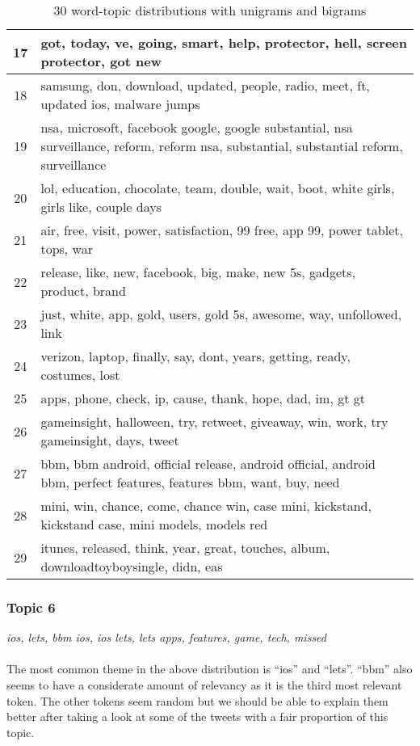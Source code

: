 \begin{table}
\begin{tabular}{c p{16cm}}
    17    & got, today, ve, going, smart, help, protector, hell, screen protector, got new \\ \midrule
    18    & samsung, don, download, updated, people, radio, meet, ft, updated ios, malware jumps \\ \midrule
    19    & nsa, microsoft, facebook google, google substantial, nsa surveillance, reform, reform nsa, substantial, substantial reform, surveillance \\ \midrule
    20    & lol, education, chocolate, team, double, wait, boot, white girls, girls like, couple days \\ \midrule
    21    & air, free, visit, power, satisfaction, 99 free, app 99, power tablet, tops, war \\ \midrule
    22    & release, like, new, facebook, big, make, new 5s, gadgets, product, brand \\ \midrule
    23    & just, white, app, gold, users, gold 5s, awesome, way, unfollowed, link \\ \midrule
    24    & verizon, laptop, finally, say, dont, years, getting, ready, costumes, lost \\ \midrule
    25    & apps, phone, check, ip, cause, thank, hope, dad, im, gt gt \\ \midrule
    26    & gameinsight, halloween, try, retweet, giveaway, win, work, try gameinsight, days, tweet \\ \midrule
    27    & bbm, bbm android, official release, android official, android bbm, perfect features, features bbm, want, buy, need \\ \midrule
    28    & mini, win, chance, come, chance win, case mini, kickstand, kickstand case, mini models, models red \\ \midrule
    29    & itunes, released, think, year, great, touches, album, downloadtoyboysingle, didn, eas \\ \bottomrule
  \end{tabular}
  \caption{30 word-topic distributions with unigrams and bigrams}
  \label{tab:unigrams_bigrams_lda}
\end{table}



\subsubsection{Topic 6}
\label{sec:topic_6}
\textit{ios, lets, bbm ios, ios lets, lets apps, features, game, tech, missed} \\\\
The most common theme in the above distribution is ``ios'' and ``lets''. ``bbm'' also seems to have
a considerate amount of relevancy as it is the third most relevant token. The other tokens seem
random but we should be able to explain them better after taking a look at some of the tweets with a
fair proportion of this topic.

